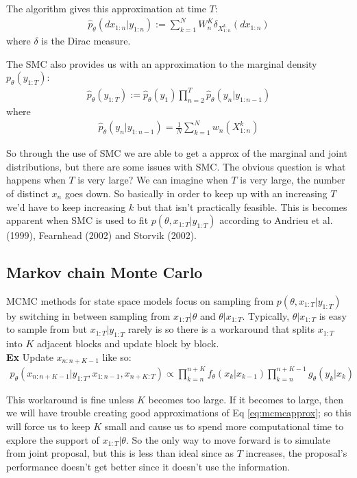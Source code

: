 \documentclass{article}\usepackage[]{graphicx}\usepackage[]{color}
\theoremstyle{definition}
\begin{document}
The algorithm gives this approximation at time $T$:
\begin{align}
  \hat{p}_\theta(dx_{1:n} | y_{1:n}) := \sum \limits_{k=1}^N W^K_n \delta_{X^k_{1:n}}(dx_{1:n})
\end{align}
where $\delta$ is the Dirac measure.

The SMC also provides us with an approximation to the marginal density $p_\theta(y_{1:T})$:
\begin{align}
  \hat{p}_\theta(y_{1:T}) := \hat{p}_\theta(y_1) \prod \limits_{n=2}^T \hat{p}_\theta(y_n|y_{1:n-1})
\end{align}
where
\begin{align*}
  \hat{p}_\theta(y_n|y_{1:n-1}) = \frac{1}{N} \sum \limits_{k=1}^N w_n(X^k_{1:n})
\end{align*}

So through the use of SMC we are able to get a approx of the marginal and joint distributions, but there are some issues with SMC. The obvious question is what happens when $T$ is very large? We can imagine when $T$ is very large, the number of distinct $x_n$ goes down. So basically in order to keep up with an increasing $T$ we'd have to keep increasing $k$ but that isn't practically feasible. This is becomes apparent when SMC is used to fit $p(\theta, x_{1:T}|y_{1:T})$ according to Andrieu et al.(1999), Fearnhead (2002) and Storvik (2002).




\subsection{Markov chain Monte Carlo}

MCMC methods for state space models focus on sampling from $p(\theta, x_{1:T}|y_{1:T})$ by switching in between sampling from $x_{1:T}|\theta$ and $\theta|x_{1:T}$. Typically, $\theta|x_{1:T}$ is easy to sample from but $x_{1:T}|y_{1:T}$ rarely is so there is a workaround that splits $x_{1:T}$ into $K$ adjacent blocks and update block by block. \\

{\bf Ex} Update $x_{n:n+K-1}$ like so:
\begin{align}
  p_\theta(x_{n:n+K-1}|y_{1:T},x_{1:n-1},x_{n+K:T}) \propto \prod \limits_{k=n}^{n+K} f_\theta(x_k|x_{k-1}) \prod \limits_{k=n}^{n+K-1} g_\theta(y_k|x_k) \label{eq:mcmcapprox}
\end{align}

This workaround is fine unless $K$ becomes too large. If it becomes to large, then we will have trouble creating good approximations of Eq \ref{eq:mcmcapprox}; so this will force us to keep $K$ small and cause us to spend more computational time to explore the support of $x_{1:T}|\theta$. So the only way to move forward is to simulate from joint proposal, but this is less than ideal since as $T$ increases, the proposal's performance doesn't get better since it doesn't use the information.
\end{document}
